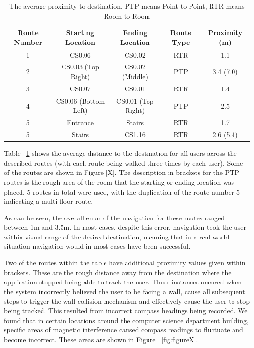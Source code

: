 \documentclass[12pt,a4paper]{report}
\begin{document}
\begin{table}[ht]
	\begin{tabular}{| c || c | c | c | c |}
		\hline
		Route Number & Starting Location & Ending Location & Route Type & Proximity (m) \\
		\hline
		1 & CS0.06 & CS0.02 & RTR & 1.1 \\
		2 & CS0.03 (Top Right) & CS0.02 (Middle) & PTP & 3.4 (7.0) \\
		3 & CS0.07 & CS0.01 & RTR & 1.4 \\
		4 & CS0.06 (Bottom Left) & CS0.01 (Top Right) & PTP & 2.5\\ 
		5 & Entrance & Stairs & RTR & 1.7 \\
		5 & Stairs & CS1.16 & RTR & 2.6 (5.4) \\
		\hline
	\end{tabular}
	\label{tab:routes}
	\caption{The average proximity to destination, PTP means Point-to-Point, RTR means Room-to-Room}
\end{table}

Table ~\ref{tab:routes} shows the average distance to the destination for all users across the described routes (with each route being walked three times by each user). Some of the routes are shown in Figure [X]. The description in brackets for the PTP routes is the rough area of the room that the starting or ending location was placed. 5 routes in total were used, with the duplication of the route number 5 indicating a multi-floor route.

As can be seen, the overall error of the navigation for these routes ranged between 1m and 3.5m. In most cases, despite this error, navigation took the user within visual range of the desired destination, meaning that in a real world situation navigation would in most cases have been successful.

Two of the routes within the table have additional proximity values given within brackets. These are the rough distance away from the destination where the application stopped being able to track the user.  These instances occured when the system incorrectly believed the user to be facing a wall, cause all subsequent steps to trigger the wall collision mechanism and effectively cause the user to stop being tracked. This resulted from incorrect compass headings being recorded. We found that in certain locations around the computer science department building, specific areas of magnetic interference caused compass readings to fluctuate and become incorrect. These areas are shown in Figure ~\ref{fig:figureX}.
\end{document}
